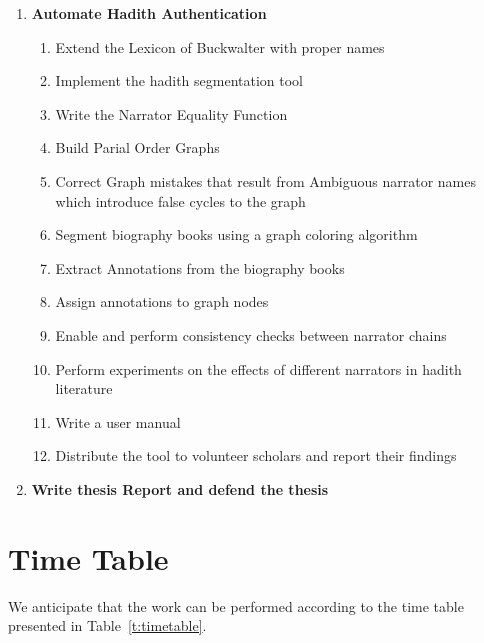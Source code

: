 \documentclass[a4,12pt]{report}
\begin{document}
\begin{enumerate}[1.]
\item \textbf{Automate Hadith Authentication} \label{I:Hadith}
	\begin{enumerate}
	\item Extend the Lexicon of Buckwalter with proper names \label{I:HadithNames}
	\item Implement the hadith segmentation tool \label{I:HadithSegmentation}
	\item Write the Narrator Equality Function \label{I:HadithEquality}
	\item Build Parial Order Graphs \label{I:HadithPOR}
	\item Correct Graph mistakes that result from Ambiguous narrator names which introduce false cycles to the graph \label{I:HadithBreakCycles}
	\item Segment biography books using a graph coloring algorithm \label{I:BiographySegmentation}
	\item Extract Annotations from the biography books \label{I:BiographyAnnotationExtraction}
	\item Assign annotations to graph nodes \label{I:HadithPORAnnotation}
	\item Enable and perform consistency checks between narrator chains \label{I:HadithChecks}
	\item Perform experiments on the effects of different narrators in hadith literature \label{I:HadithExperiments}
	\item Write a user manual \label{I:HadithManual}
	\item Distribute the tool to volunteer scholars and report their findings \label{I:HadithScolars}
	\end{enumerate}
\item \textbf{Write thesis Report and defend the thesis} \label{I:WriteReport}
\end{enumerate}

\section{Time Table}

We anticipate that the work can be performed according to the time table presented in
Table~\ref{t:timetable}. \\

~\\
\end{document}
